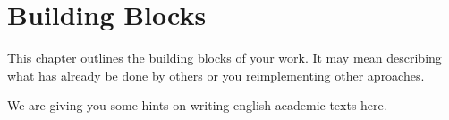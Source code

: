 \chapter{Building Blocks}

This chapter outlines the building blocks of your work.
It may mean describing what has already be done by others or you reimplementing other aproaches.

We are giving you some hints on writing english academic texts here.